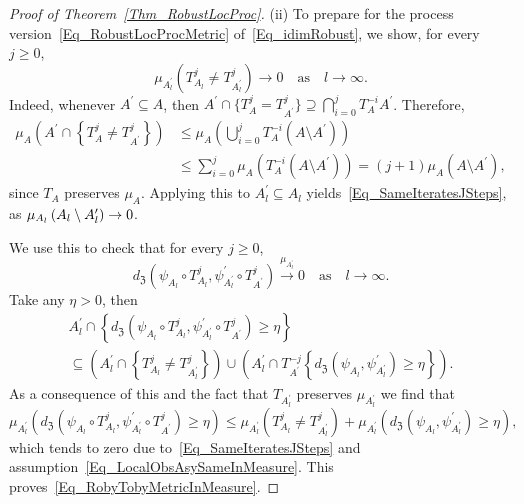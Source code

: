 \documentclass[AHL,Unicode,longabstracts]{cedram}
\newcommand{\frkZ}{\mathfrak{Z}}
\begin{document}
\begin{proof}[{Proof of Theorem~\ref{Thm_RobustLocProc}}]
\vspace{6pt}
\noindent (ii) To prepare for the process version~\eqref{Eq_RobustLocProcMetric} of~\eqref{Eq_idimRobust}, we show, for every $j\geq0$,
\begin{equation}\label{Eq_SameIteratesJSteps}
\mu_{A_{l}^{\prime}}\left(T_{A_{l}}^{j}\neq T_{A_{l}^{\prime}}^{j}\right)\longrightarrow 0\quad\text{as}\quad l\rightarrow\infty. 
\end{equation}
Indeed, whenever $A^{\prime}\subseteq A$, then $A^{\prime}\cap\{T_{A} ^{j}=T_{A^{\prime}}^{j}\}\supseteq {\textstyle\bigcap\nolimits_{i=0}^{j}} T_{A}^{-i}A^{\prime}$. Therefore,
\begin{align*}
\mu_{A}\left(A^{\prime}\cap\left\{T_{A}^{j}\neq T_{A^{\prime}}^{j}\right\}\right) & \leq\mu _{A}\left({\textstyle\bigcup\nolimits_{i=0}^{j}} T_{A}^{-i}\left(A\setminus A^{\prime}\right)\right) \\
& \leq {\textstyle\sum\limits_{i=0}^{j}}
\mu_{A}\left(T_{A}^{-i}\left(A\setminus A^{\prime}\right)\right) =(j+1)\mu_{A}\left(A\setminus A^{\prime}\right),
\end{align*}
since $T_{A}$ preserves $\mu_{A}$. Applying this to $A_{l}^{\prime}\subseteq A_{l}$ yields~\eqref{Eq_SameIteratesJSteps}, as $\mu_{A_{l}}\left(A_{l}\setminus A_{l}^{\prime}\right)\linebreak \rightarrow0$.

We use this to check that for every $j\geq0$,
\begin{equation}\label{Eq_RobyTobyMetricInMeasure}
d_{\frkZ}\left(\psi_{A_{l}}\circ T_{A_{l}}^{j},\psi_{A_{l}^{\prime}} ^{\prime}\circ T_{A^{\prime}}^{j}\right)\overset{\mu_{A_{l}^{\prime}}} {\longrightarrow}0\quad\text{as}\quad l\rightarrow\infty.
\end{equation}
Take any $\eta>0$, then
\begin{multline*}
A_{l}^{\prime}\cap\left\{d_{\frkZ}\left(\psi_{A_{l} }\circ T_{A_{l}}^{j},\psi_{A_{l}^{\prime}}^{\prime}\circ T_{A^{\prime}} ^{j}\right)\geq\eta\right\}\\
\subseteq\left(A_{l}^{\prime}\cap\left\{T_{A_{l}}^{j}\neq T_{A_{l} ^{\prime}}^{j}\right\}\right)\cup\left(A_{l}^{\prime}\cap T_{A^{\prime}}^{-j}\left\{d_{\frkZ }\left(\psi_{A_{l}},\psi_{A_{l}^{\prime}}^{\prime}\right)\geq\eta\right\}\right).
\end{multline*}
As a consequence of this and the fact that $T_{A_{l}^{\prime}}$ preserves $\mu_{A_{l}^{\prime} }$ we find that
\[
\mu_{A_{l}^{\prime}}\left(d_{\frkZ}\left(\psi_{A_{l}}\circ T_{A_{l}}^{j},\psi_{A_{l}^{\prime}}^{\prime}\circ T_{A^{\prime}}^{j}\right)\geq\eta\right)\leq
\mu_{A_{l}^{\prime}}\left(T_{A_{l}}^{j}\neq T_{A_{l}^{\prime}}^{j}\right)+\mu _{A_{l}^{\prime}}\left(d_{\frkZ}\left(\psi_{A_{l}},\psi_{A_{l}^{\prime}}^{\prime}\right)\geq\eta\right),
\]
which tends to zero due to~\eqref{Eq_SameIteratesJSteps} and assumption~\eqref{Eq_LocalObsAsySameInMeasure}. This proves~\eqref{Eq_RobyTobyMetricInMeasure}.
 

\end{proof}
\end{document}

